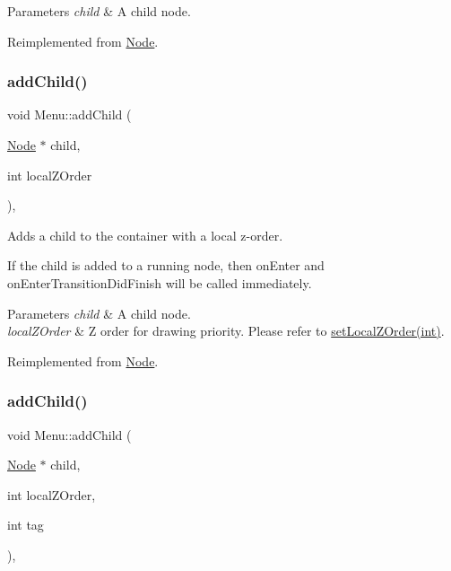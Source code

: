 \begin{DoxyParams}{Parameters}
{\em child} & A child node. \\
\hline
\end{DoxyParams}


Reimplemented from \hyperlink{classNode_a132699398b350e83b548a5645e69beb0}{Node}.

\mbox{\label{classMenu_a38455f79cd083475d9beacf0cc9caf81}} 
\subsubsection{\texorpdfstring{add\+Child()}{addChild()}\hspace{0.1cm}{\footnotesize\ttfamily [3/8]}}
{\footnotesize\ttfamily void Menu\+::add\+Child (\begin{DoxyParamCaption}\item[{\hyperlink{classNode}{Node} $\ast$}]{child,  }\item[{int}]{local\+Z\+Order }\end{DoxyParamCaption})\hspace{0.3cm}{\ttfamily [override]}, {\ttfamily [virtual]}}

Adds a child to the container with a local z-\/order.

If the child is added to a \textquotesingle{}running\textquotesingle{} node, then \textquotesingle{}on\+Enter\textquotesingle{} and \textquotesingle{}on\+Enter\+Transition\+Did\+Finish\textquotesingle{} will be called immediately.


\begin{DoxyParams}{Parameters}
{\em child} & A child node. \\
\hline
{\em local\+Z\+Order} & Z order for drawing priority. Please refer to {\ttfamily \hyperlink{classNode_aee4e616c2d55b722226aae1e68b4946f}{set\+Local\+Z\+Order(int)}}. \\
\hline
\end{DoxyParams}


Reimplemented from \hyperlink{classNode_ad0005bbb94623abd997ce7c3116e6212}{Node}.

\mbox{\label{classMenu_a540593eb7fb7de286fe64d6da9c67618}} 
\subsubsection{\texorpdfstring{add\+Child()}{addChild()}\hspace{0.1cm}{\footnotesize\ttfamily [4/8]}}
{\footnotesize\ttfamily void Menu\+::add\+Child (\begin{DoxyParamCaption}\item[{\hyperlink{classNode}{Node} $\ast$}]{child,  }\item[{int}]{local\+Z\+Order,  }\item[{int}]{tag }\end{DoxyParamCaption})\hspace{0.3cm}{\ttfamily [override]}, {\ttfamily [virtual]}}

